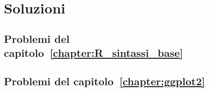 \chapter*{Soluzioni}


\section*{Problemi del capitolo~\ref{chapter:R_sintassi_base}} %



\section*{Problemi del capitolo~\ref{chapter:ggplot2}} %

